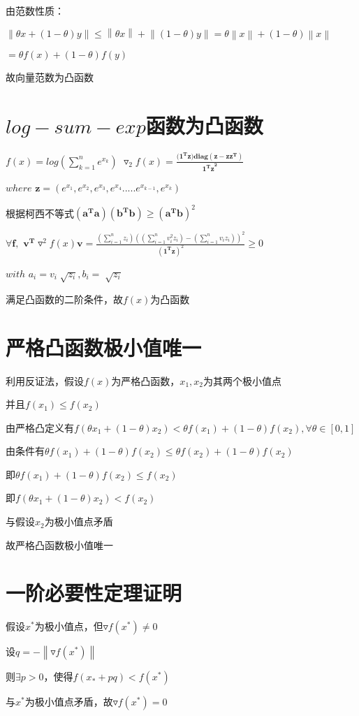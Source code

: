 \documentclass[12pt, a4paper, oneside, fontset=windows]{ctexart}
\begin{document}
由范数性质：

$\left \| \theta x +(1-\theta )y \right \| \leq \left \| \theta x \right \| + \left \| (1-\theta)y \right \| = \theta \left \| x \right \| + (1-\theta) \left \| x \right \|$

$= \theta f(x) + (1-\theta) f(y)$

故向量范数为凸函数


\section{$log-sum-exp$函数为凸函数}
$f(x) = log(\sum_{k=1}^{n}e^{x_{k}})$
$\triangledown _{2} f(x) = \frac{(\mathbf{1^{T}z)diag(\mathbf{z} - \mathbf{zz^{T}})}}{\mathbf{{1^{T}z}^{2}}}$

$where$ $\mathbf{z} = (e^{x_{1}},e^{x_{2}},e^{x_{3}},e^{x_{4}}.....e^{x_{k-1}},e^{x_{k}})$

根据柯西不等式$(\mathbf{a^{T}a})(\mathbf{b^{T}b}) \geq {(\mathbf{a^{T}b})}^{2}$

$\forall \mathbf{f},$ $\mathbf{v^{T}}\triangledown^{2}f(x)\mathbf{v} = \frac{(\sum_{i=1}^{n}z_{i})((\sum_{i = 1}^{n}v_{i}^{2}z_{i})-(\sum_{i=1}^{n}v_{i}z_{i}))^{2}}{(\mathbf{1^{T}z})^{2}}\geq 0$

$with$ $a_{i}= v_{i} \sqrt[]{z_{i}}, b_{i} = \sqrt[]{z_{i}}$

满足凸函数的二阶条件，故$f(x)$为凸函数
\section{严格凸函数极小值唯一}
利用反证法，假设$f(x)$为严格凸函数，$x_{1},x_{2}$为其两个极小值点

并且$f(x_{1}) \leq f(x_{2})$

由严格凸定义有$f(\theta x_{1} + (1 -\theta) x_{2}) < \theta f(x_{1}) + (1-\theta)f(x_{2}), \forall \theta \in [0,1]$

由条件有$\theta f(x_{1}) + (1-\theta)f(x_{2}) \leq \theta f(x_{2}) + (1-\theta)f(x_{2})$

即$\theta f(x_{1}) + (1-\theta)f(x_{2}) \leq f(x_{2})$

即$f(\theta x_{1} + (1 -\theta) x_{2}) < f(x_{2})$

与假设$x_{2}$为极小值点矛盾

故严格凸函数极小值唯一

\section{一阶必要性定理证明}
假设$x^{*}$为极小值点，但$\triangledown f(x^{*})\neq 0$

设$q = -\left \| \triangledown f(x^{*}) \right \|$

则$\exists p > 0$，使得$f(x_{*} +pq) < f(x^{*})$

与$x^{*}$为极小值点矛盾，故$\triangledown f(x^{*})= 0$
\end{document}
